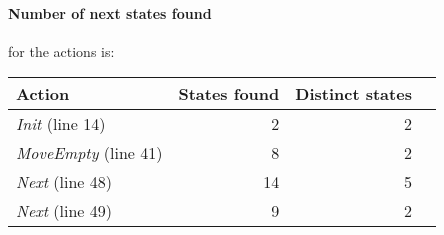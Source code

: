 \documentclass{article}
\begin{document}
\paragraph{Number of next states found} for the actions is:

\begin{table}[h]
\begin{tabular}{lrrr}
	\hline
	\textbf{Action} & \textbf{States found} & \textbf{Distinct states} \\ \hline
	\textit{Init} (line 14) & 2 & 2 \\
	\textit{MoveEmpty} (line 41) & 8 & 2 \\
	\textit{Next} (line 48) & 14 & 5 \\
	\textit{Next} (line 49) & 9 & 2 \\
	\hline
\end{tabular}
\end{table}
\end{document}
